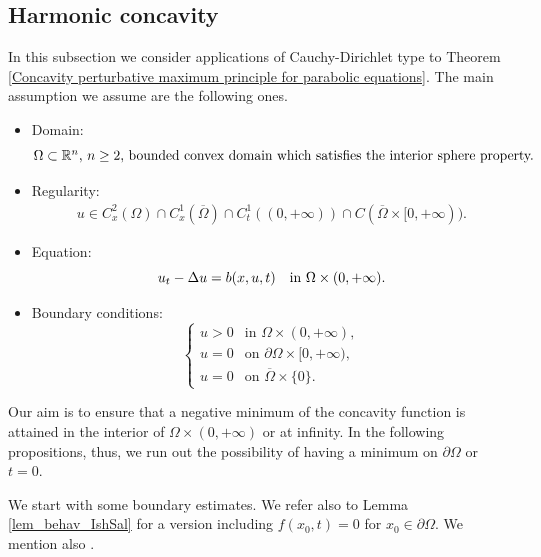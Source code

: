 \documentclass[11pt, reqno]{amsart}
\theoremstyle{definition}
\numberwithin{equation}{section}
\newcommand{\Omegabar}{\overline{\Omega}}
\newcommand{\R}{\mathbb{R}}
\begin{document}
\subsection{Harmonic concavity} 
\label{subsec_harmon_boundar}

In this subsection we consider applications of Cauchy-Dirichlet type to Theorem \ref{Concavity perturbative maximum principle for parabolic equations}.
The main assumption we assume are the following ones.
\begin{itemize}[wide]
	\item[-]
	Domain:
	\begin{equation}\label{eq_ipost_domain}
	\hbox{$\Omega \subset \R^n$, $n\geq 2$, bounded convex domain which satisfies the interior sphere property.}
	\end{equation}
	\item[-] Regularity: 
	\begin{align}\label{regularity conditions}
	u\in C^2_x(\Omega)\cap C^1_x(\Omegabar)\cap C^1_t((0,+\infty))\cap C(\Omegabar\times[0,+\infty)).
	\end{align} 
	\item[-] Equation:
	\begin{equation}\label{eq_general_bxu}
	u_t-\Delta u=b(x,u, t) \quad\hbox{in }\Omega\times (0,+\infty).
	\end{equation}
	\item[-] Boundary conditions: 
	\begin{equation}\label{boundary and initial conditions}
		\begin{cases}
				u>0 & \text{in } \Omega\times (0,+\infty),\\
					u=0 & \text{on }\partial \Omega\times [0,+\infty),	 \\
					u =0 & \text{on } \Omegabar \times \{0\}. 
		\end{cases}
	\end{equation}
\end{itemize}

Our aim is to ensure that a negative minimum of the concavity function is attained in the interior of $\Omega \times (0,+\infty)$ or at infinity. 
In the following propositions, thus, we run out the possibility of having a minimum on $\partial \Omega$ or $t=0$.

We start with some boundary estimates.
We refer also to Lemma \ref{lem_behav_IshSal} for a version including $f(x_0,t)=0$ for $x_0 \in \partial \Omega$. 
We mention also \cite[Theorem 5]{MaSo00}. 
\end{document}
